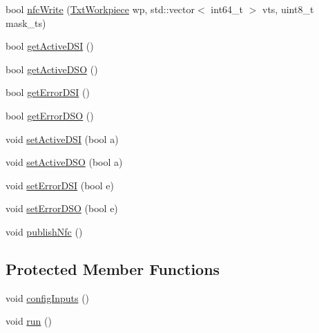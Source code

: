 \begin{DoxyCompactItemize}
bool \hyperlink{classft_1_1_txt_delivery_pickup_station_a7e407effb289ac3dd87b291c93268bfd}{nfc\+Write} (\hyperlink{classft_1_1_txt_workpiece}{Txt\+Workpiece} wp, std\+::vector$<$ int64\+\_\+t $>$ vts, uint8\+\_\+t mask\+\_\+ts)
\item 
bool \hyperlink{classft_1_1_txt_delivery_pickup_station_a1f6f02d4339dc617df0aec61f68c21fa}{get\+Active\+D\+SI} ()
\item 
bool \hyperlink{classft_1_1_txt_delivery_pickup_station_ac15031b5fbc55bc89a100411f5839a98}{get\+Active\+D\+SO} ()
\item 
bool \hyperlink{classft_1_1_txt_delivery_pickup_station_ad2bd096de2e0d0064834653b918d866d}{get\+Error\+D\+SI} ()
\item 
bool \hyperlink{classft_1_1_txt_delivery_pickup_station_acc30a29eedb6190e9874cb54cda1f63f}{get\+Error\+D\+SO} ()
\item 
void \hyperlink{classft_1_1_txt_delivery_pickup_station_aa9d1d7f5d476c61071260430bb38c65d}{set\+Active\+D\+SI} (bool a)
\item 
void \hyperlink{classft_1_1_txt_delivery_pickup_station_ac2722bc473ae73060bfdc497cba2cb12}{set\+Active\+D\+SO} (bool a)
\item 
void \hyperlink{classft_1_1_txt_delivery_pickup_station_a4044a94be6502f2509b612d19a290d9f}{set\+Error\+D\+SI} (bool e)
\item 
void \hyperlink{classft_1_1_txt_delivery_pickup_station_aead09d37cc281dce15ba8fb4eba97aa7}{set\+Error\+D\+SO} (bool e)
\item 
void \hyperlink{classft_1_1_txt_delivery_pickup_station_af9f43240d96991a2ce6da2b10b6301ae}{publish\+Nfc} ()
\end{DoxyCompactItemize}
\subsection*{Protected Member Functions}
\begin{DoxyCompactItemize}
\item 
void \hyperlink{classft_1_1_txt_delivery_pickup_station_a0f9aecee2f58d3d4ec9cc1b7c3601301}{config\+Inputs} ()
\item 
void \hyperlink{classft_1_1_txt_delivery_pickup_station_a3246bd3852c8030a7cf641d1891a41b7}{run} ()
\end{DoxyCompactItemize}
